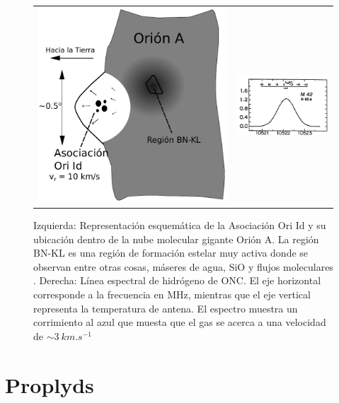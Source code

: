 \begin{figure}
  \centering
  \begin{tabular}{lr}
    \includegraphics[width=0.4\linewidth]{./Figures/champagne} &
    \includegraphics[width=0.5\linewidth]{./Figures/H85-alpha}
    \end{tabular}
  \caption[Asociación Ori Id]{Izquierda: Representación esquemática de la Asociación Ori Id y su ubicación dentro de la nube molecular gigante Orión A. La región BN-KL es una región de formación estelar muy activa donde se observan entre otras cosas, máseres de agua, SiO y flujos moleculares \citep{Stahler:2004}. Derecha: Línea espectral  de hidrógeno de ONC. El eje horizontal corresponde a la frecuencia en MHz, mientras que el eje vertical representa la temperatura de antena. El espectro muestra un corrimiento al azul que muesta que el gas se acerca a una velocidad de $\sim \SI{3}{km.s^{-1}}$ \citep{Stahler:2004, Churchwell:1970}}
  \label{fig:champagne}
\end{figure}

\section{Proplyds}
